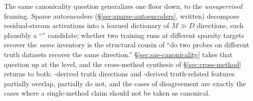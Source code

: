 The same canonicality question generalizes one floor down, to the
\emph{unsupervised}  framing. Sparse autoencoders
(\S\ref{sec:sparse-autoencoders}, written) decompose residual-stream
activations into a learned dictionary of $M \gg D$ directions, each
plausibly a ``'' candidate; whether two  training runs at
different sparsity targets recover the \emph{same}  inventory
is the structural cousin of ``do two probes on different truth datasets
recover the same direction.''
\S\ref{sec:sae-canonicality} takes that question up at the  level,
and the cross-method synthesis of \S\ref{sec:cross-method} returns to
both: -derived truth directions and -derived truth-related
features partially overlap, partially do not, and the cases of
disagreement are exactly the cases where a single-method claim should
not be taken as canonical.
